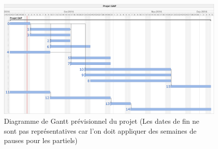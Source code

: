 \documentclass[12pt]{article}
\begin{document}
        \begin{figure}[h]
        \begin{center}
            \includegraphics[width=1\textwidth]{gantt.png}
                \caption{Diagramme de Gantt prévisionnel du projet (Les dates de fin ne sont pas représentatives car l'on doit appliquer des semaines de pauses pour les partiels)}
        \end{center}
        \end{figure}
        
\end{document}

